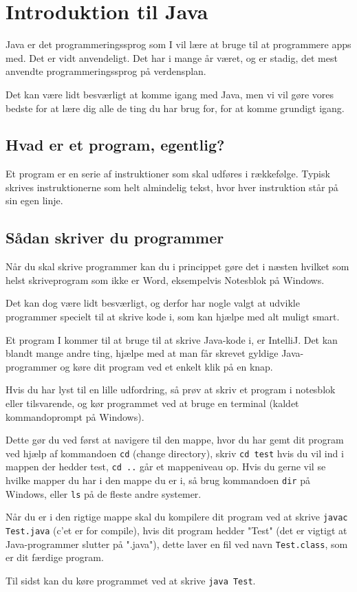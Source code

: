 \chapter{Introduktion til Java}
Java er det programmeringssprog som I vil lære at bruge til at programmere apps med. Det er vidt anvendeligt. Det har i mange år været, og er stadig, det mest anvendte programmeringssprog på verdensplan.

Det kan være lidt besværligt at komme igang med Java, men vi vil gøre vores bedste for at lære dig alle de ting du har brug for, for at komme grundigt igang.


\section{Hvad er et program, egentlig?}
Et program er en serie af instruktioner som skal udføres i rækkefølge. Typisk skrives instruktionerne som helt almindelig tekst, hvor hver instruktion står på sin egen linje.

\section{Sådan skriver du programmer}
Når du skal skrive programmer kan du i princippet gøre det i næsten hvilket som helst skriveprogram som ikke er Word, eksempelvis Notesblok på Windows. 

Det kan dog være lidt besværligt, og derfor har nogle valgt at udvikle programmer specielt til at skrive kode i, som kan hjælpe med alt muligt smart. 

Et program I kommer til at bruge til at skrive Java-kode i, er IntelliJ. Det kan blandt mange andre ting, hjælpe med at man får skrevet gyldige Java-programmer og køre dit program ved et enkelt klik på en knap.

\begin{remark}
	Hvis du har lyst til en lille udfordring, så prøv at skriv et program i notesblok eller tilsvarende, og kør programmet ved at bruge en terminal (kaldet kommandoprompt på Windows). 
	
	Dette gør du ved først at navigere til den mappe, hvor du har gemt dit program ved hjælp af kommandoen \texttt{cd} (change directory), skriv \texttt{cd test} hvis du vil ind i mappen der hedder test, \texttt{cd ..} går et mappeniveau op. Hvis du gerne vil se hvilke mapper du har i den mappe du er i, så brug kommandoen \texttt{dir} på Windows, eller \texttt{ls} på de fleste andre systemer. 
	
	Når du er i den rigtige mappe skal du kompilere dit program ved at skrive \texttt{javac Test.java} (c'et er for compile), hvis dit program hedder "Test" (det er vigtigt at Java-programmer slutter på ".java"), dette laver en fil ved navn \texttt{Test.class}, som er dit færdige program. 
	
	Til sidst kan du køre programmet ved at skrive \texttt{java Test}.
\end{remark}

